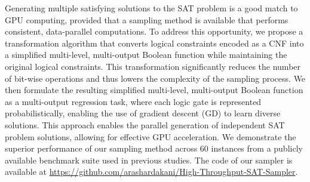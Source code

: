 Generating multiple satisfying solutions to the SAT problem is a good match to GPU computing, provided that a sampling method is available that performs consistent, data-parallel computations.
To address this opportunity, we propose a transformation algorithm that converts logical constraints encoded as a CNF into a simplified multi-level, multi-output Boolean function while maintaining the original logical constraints. This transformation significantly reduces the number of bit-wise operations and thus lowers the complexity of the sampling process.
We then formulate the resulting simplified multi-level, multi-output Boolean function as a multi-output regression task, where each logic gate is represented probabilistically, enabling the use of gradient descent (GD) to learn diverse solutions. This approach enables the parallel generation of independent SAT problem solutions, allowing for effective GPU acceleration.
We demonstrate the superior performance of our sampling method across $60$ instances from a publicly available benchmark suite \cite{meel_2020_benchmark} used in previous studies. The code of our sampler is available at \url{https://github.com/arashardakani/High-Throughput-SAT-Sampler}.
















